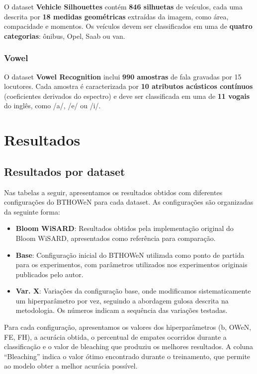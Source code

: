\documentclass{article}
\begin{document}
O dataset \textbf{Vehicle Silhouettes} contém \textbf{846 silhuetas} de veículos, cada uma descrita por \textbf{18 medidas geométricas} extraídas da imagem, como área, compacidade e momentos. Os veículos devem ser classificados em uma de \textbf{quatro categorias}: ônibus, Opel, Saab ou van.

\subsubsection{Vowel}

O dataset \textbf{Vowel Recognition} inclui \textbf{990 amostras} de fala gravadas por 15 locutores. Cada amostra é caracterizada por \textbf{10 atributos acústicos contínuos} (coeficientes derivados do espectro) e deve ser classificada em uma de \textbf{11 vogais} do inglês, como /a/, /e/ ou /i/.

\section{Resultados}

\subsection{Resultados por dataset}

Nas tabelas a seguir, apresentamos os resultados obtidos com diferentes configurações do BTHOWeN para cada dataset. As configurações são organizadas da seguinte forma:

\begin{itemize}
    \item \textbf{Bloom WiSARD}: Resultados obtidos pela implementação original do Bloom WiSARD, apresentados como referência para comparação.
    \item \textbf{Base}: Configuração inicial do BTHOWeN utilizada como ponto de partida para os experimentos, com parâmetros utilizados nos experimentos originais publicados pelo autor.
    \item \textbf{Var. X}: Variações da configuração base, onde modificamos sistematicamente um hiperparâmetro por vez, seguindo a abordagem gulosa descrita na metodologia. Os números indicam a sequência das variações testadas.
\end{itemize}

Para cada configuração, apresentamos os valores dos hiperparâmetros (b, OWeN, FE, FH), a acurácia obtida, o percentual de empates ocorridos durante a classificação e o valor de bleaching que produziu os melhores resultados. A coluna ``Bleaching'' indica o valor ótimo encontrado durante o treinamento, que permite ao modelo obter a melhor acurácia possível.
\end{document}
